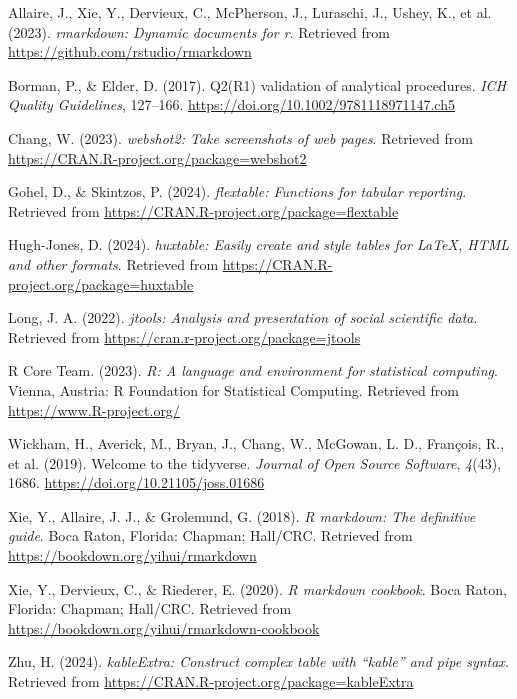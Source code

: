 \documentclass[
]{agujournal2019}
\newlength{\cslhangindent}
\newenvironment{CSLReferences}[2] %
 {\begin{list}{}{%
  \setlength{\itemindent}{0pt}
  \setlength{\leftmargin}{0pt}
  \setlength{\parsep}{0pt}
  \ifodd #1
   \setlength{\leftmargin}{\cslhangindent}
   \setlength{\itemindent}{-1\cslhangindent}
  \fi
  \setlength{\itemsep}{#2\baselineskip}}}
 {\end{list}}
\begin{document}
\label{refs}
\begin{CSLReferences}{1}{0}
\vspace{1em}

Allaire, J., Xie, Y., Dervieux, C., McPherson, J., Luraschi, J., Ushey,
K., et al. (2023). \emph{{rmarkdown}: Dynamic documents for r}.
Retrieved from \url{https://github.com/rstudio/rmarkdown}

Borman, P., \& Elder, D. (2017). Q2(R1) validation of analytical
procedures. \emph{ICH Quality Guidelines}, 127--166.
\url{https://doi.org/10.1002/9781118971147.ch5}

Chang, W. (2023). \emph{webshot2: Take screenshots of web pages}.
Retrieved from \url{https://CRAN.R-project.org/package=webshot2}

Gohel, D., \& Skintzos, P. (2024). \emph{{flextable}: Functions for
tabular reporting}. Retrieved from
\url{https://CRAN.R-project.org/package=flextable}

Hugh-Jones, D. (2024). \emph{{huxtable}: Easily create and style tables
for LaTeX, HTML and other formats}. Retrieved from
\url{https://CRAN.R-project.org/package=huxtable}

Long, J. A. (2022). \emph{{jtools}: Analysis and presentation of social
scientific data}. Retrieved from
\url{https://cran.r-project.org/package=jtools}

R Core Team. (2023). \emph{{R}: A language and environment for
statistical computing}. Vienna, Austria: R Foundation for Statistical
Computing. Retrieved from \url{https://www.R-project.org/}

Wickham, H., Averick, M., Bryan, J., Chang, W., McGowan, L. D.,
François, R., et al. (2019). Welcome to the {tidyverse}. \emph{Journal
of Open Source Software}, \emph{4}(43), 1686.
\url{https://doi.org/10.21105/joss.01686}

Xie, Y., Allaire, J. J., \& Grolemund, G. (2018). \emph{R markdown: The
definitive guide}. Boca Raton, Florida: Chapman; Hall/CRC. Retrieved
from \url{https://bookdown.org/yihui/rmarkdown}

Xie, Y., Dervieux, C., \& Riederer, E. (2020). \emph{R markdown
cookbook}. Boca Raton, Florida: Chapman; Hall/CRC. Retrieved from
\url{https://bookdown.org/yihui/rmarkdown-cookbook}

Zhu, H. (2024). \emph{{kableExtra}: Construct complex table with
{``{kable}''} and pipe syntax}. Retrieved from
\url{https://CRAN.R-project.org/package=kableExtra}

\end{CSLReferences}
\end{document}
